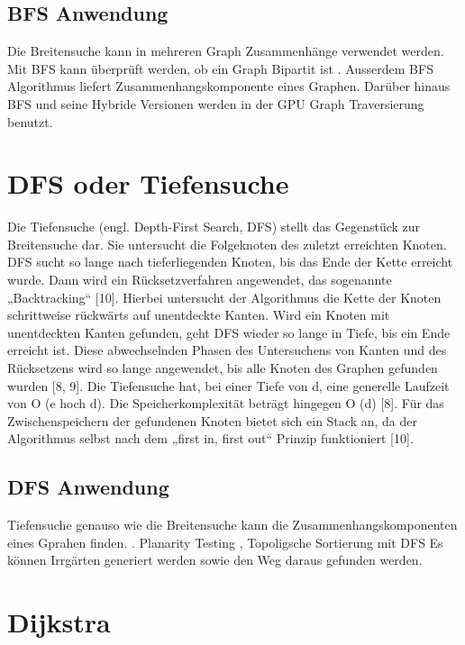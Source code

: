 \subsection{BFS Anwendung}
Die Breitensuche kann in mehreren Graph Zusammenhänge verwendet werden.  Mit BFS kann überprüft werden, ob ein Graph Bipartit ist \cite{propTest}. Ausserdem BFS Algorithmus liefert Zusammenhangskomponente eines Graphen\cite{schmitz}. Darüber hinaus BFS und seine Hybride Versionen\cite{effHyb} werden in der GPU Graph Traversierung benutzt\cite{scaleGPU}. 

\section{DFS oder Tiefensuche}

Die Tiefensuche (engl. Depth-First Search, DFS) stellt das Gegenstück zur Breitensuche dar. Sie untersucht die Folgeknoten des zuletzt erreichten Knoten. DFS sucht so lange nach tieferliegenden Knoten, bis das Ende der Kette erreicht wurde. Dann wird ein Rücksetzverfahren angewendet, das sogenannte „Backtracking“ [10]. 
Hierbei untersucht der Algorithmus die Kette der Knoten schrittweise rückwärts auf unentdeckte Kanten. Wird ein Knoten mit unentdeckten Kanten gefunden, geht DFS wieder so lange in Tiefe, bis ein Ende erreicht ist. Diese abwechselnden Phasen des Untersuchens von Kanten und des Rücksetzens wird so lange angewendet, bis alle Knoten des Graphen gefunden wurden [8, 9]. Die Tiefensuche hat, bei einer Tiefe von d, eine generelle Laufzeit von O (e hoch d). Die Speicherkomplexität beträgt hingegen O (d) [8]. Für das Zwischenspeichern der gefundenen Knoten bietet sich ein Stack an, da der Algorithmus selbst nach dem „first in, first out“ Prinzip funktioniert [10].  

\subsection{DFS Anwendung}
Tiefensuche genauso wie die Breitensuche kann die Zusammenhangskomponenten eines Gprahen finden. \cite{schmitz} \cite{dfs}.  Planarity Testing \cite{dfsPlanar}, Topoligsche Sortierung mit DFS
Es können Irrgärten generiert werden sowie den Weg daraus gefunden werden\cite{examMaze}.


\section{Dijkstra}

